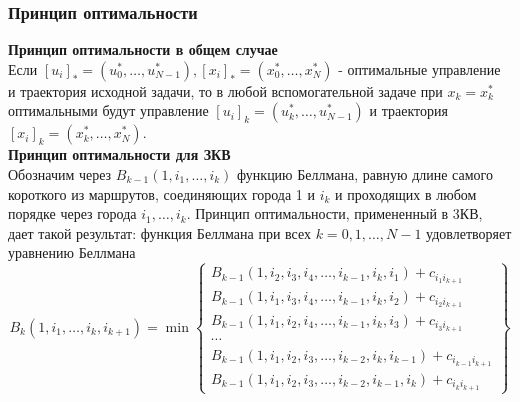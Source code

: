 \documentclass[aspectratio=1610]{beamer}
\begin{document}
  	\begin{frame}
  		\frametitle{Принцип оптимальности}
  		\textbf{Принцип оптимальности в общем случае\\}
  		Если $\left[u_{i}\right]_{*}=\left(u_{0}^{*}, \ldots, u_{N-1}^{*}\right),\left[x_{i}\right]_{*}=\left(x_{0}^{*}, \ldots, x_{N}^{*}\right)$ - оптимальные управление и
  		траектория исходной задачи, то в любой вспомогательной задаче при $x_{k}=x_{k}^{*}$  оптимальными будут управление  $\left[u_{i}\right]_{k}=\left(u_{k}^{*}, \ldots, u_{N-1}^{*}\right)$  и траектория  $\left[x_{i}\right]_{k}=\left(x_{k}^{*}, \ldots, x_{N}^{*}\right)$.\\
  		\textbf{Принцип оптимальности для ЗКВ\\}
  		Обозначим через $B_{k-1}\left(1, i_{1}, \ldots, i_{k}\right)$ функцию Беллмана, равную длине самого короткого из маршрутов, соединяющих города 1 и $i_{k}$ и проходящих в любом порядке через города $i_{1}, \ldots, i_{k}$.
  		Принцип оптимальности, примененный в 3КВ, дает такой результат:
  		функция Беллмана при всех $k=0,1, \ldots, N-1$  удовлетворяет уравнению Беллмана
  		\begin{equation}
  		B_{k}\left(1, i_{1}, \ldots, i_{k}, i_{k+1}\right)=\min \left\{\begin{array}{c}
  			B_{k-1}\left(1, i_{2}, i_{3}, i_{4}, \ldots, i_{k-1}, i_{k}, i_{1}\right)+c_{i_{1} i_{k+1}} \\
  			B_{k-1}\left(1, i_{1}, i_{3}, i_{4}, \ldots, i_{k-1}, i_{k}, i_{2}\right)+c_{i_{2} i_{k+1}} \\
  			B_{k-1}\left(1, i_{1}, i_{2}, i_{4}, \ldots, i_{k-1}, i_{k}, i_{3}\right)+c_{i_{3} i_{k+1}} \\
  			\cdots\\
  			B_{k-1}\left(1, i_{1}, i_{2}, i_{3}, \ldots, i_{k-2}, i_{k}, i_{k-1}\right)+c_{i_{k-1} i_{k+1}} \\
  			B_{k-1}\left(1, i_{1}, i_{2}, i_{3}, \ldots, i_{k-2}, i_{k-1}, i_{k}\right)+c_{i_{k} i_{k+1}}
  		\end{array}\right\}
  		\end{equation}	
  	\end{frame}
  
\end{document}
